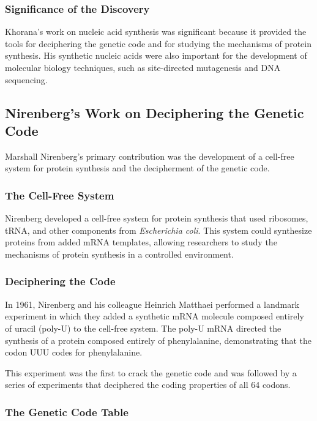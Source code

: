 \subsubsection{Significance of the Discovery}

Khorana's work on nucleic acid synthesis was significant because it provided the tools for deciphering the genetic code and for studying the mechanisms of protein synthesis. His synthetic nucleic acids were also important for the development of molecular biology techniques, such as site-directed mutagenesis and DNA sequencing.

\subsection{Nirenberg's Work on Deciphering the Genetic Code}

Marshall Nirenberg's primary contribution was the development of a cell-free system for protein synthesis and the decipherment of the genetic code.

\subsubsection{The Cell-Free System}

Nirenberg developed a cell-free system for protein synthesis that used ribosomes, tRNA, and other components from \textit{Escherichia coli}. This system could synthesize proteins from added mRNA templates, allowing researchers to study the mechanisms of protein synthesis in a controlled environment.

\subsubsection{Deciphering the Code}

In 1961, Nirenberg and his colleague Heinrich Matthaei performed a landmark experiment in which they added a synthetic mRNA molecule composed entirely of uracil (poly-U) to the cell-free system. The poly-U mRNA directed the synthesis of a protein composed entirely of phenylalanine, demonstrating that the codon UUU codes for phenylalanine.

This experiment was the first to crack the genetic code and was followed by a series of experiments that deciphered the coding properties of all 64 codons.

\subsubsection{The Genetic Code Table}

